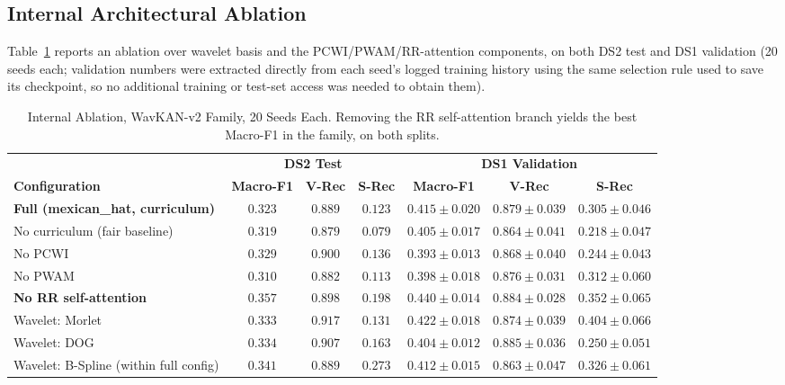 \documentclass[journal,twoside,web]{ieeecolor}
\begin{document}
\subsection{Internal Architectural Ablation}
\label{sec:results_ablation}
Table~\ref{tab:family_ablation} reports an ablation over wavelet basis and the PCWI/PWAM/RR-attention components, on both DS2 test and DS1 validation (20 seeds each; validation numbers were extracted directly from each seed's logged training history using the same selection rule used to save its checkpoint, so no additional training or test-set access was needed to obtain them).

\begin{table}[!t]
\centering
\caption{Internal Ablation, WavKAN-v2 Family, 20 Seeds Each. Removing the RR self-attention branch yields the best Macro-F1 in the family, on both splits.}
\label{tab:family_ablation}
\footnotesize
\begin{tabular}{l c c c c c c}
\toprule
& \multicolumn{3}{c}{\textbf{DS2 Test}} & \multicolumn{3}{c}{\textbf{DS1 Validation}} \\
\textbf{Configuration} & \textbf{Macro-F1} & \textbf{V-Rec} & \textbf{S-Rec} & \textbf{Macro-F1} & \textbf{V-Rec} & \textbf{S-Rec} \\ \midrule
\textbf{Full (mexican\_hat, curriculum)} & $0.323$ & $0.889$ & $0.123$ & $0.415\pm0.020$ & $0.879\pm0.039$ & $0.305\pm0.046$ \\
No curriculum (fair baseline) & $0.319$ & $0.879$ & $0.079$ & $0.405\pm0.017$ & $0.864\pm0.041$ & $0.218\pm0.047$ \\
No PCWI & $0.329$ & $0.900$ & $0.136$ & $0.393\pm0.013$ & $0.868\pm0.040$ & $0.244\pm0.043$ \\
No PWAM & $0.310$ & $0.882$ & $0.113$ & $0.398\pm0.018$ & $0.876\pm0.031$ & $0.312\pm0.060$ \\
\textbf{No RR self-attention} & $\mathbf{0.357}$ & $0.898$ & $0.198$ & $\mathbf{0.440\pm0.014}$ & $0.884\pm0.028$ & $0.352\pm0.065$ \\
Wavelet: Morlet & $0.333$ & $0.917$ & $0.131$ & $0.422\pm0.018$ & $0.874\pm0.039$ & $0.404\pm0.066$ \\
Wavelet: DOG & $0.334$ & $0.907$ & $0.163$ & $0.404\pm0.012$ & $0.885\pm0.036$ & $0.250\pm0.051$ \\
Wavelet: B-Spline (within full config) & $0.341$ & $0.889$ & $0.273$ & $0.412\pm0.015$ & $0.863\pm0.047$ & $0.326\pm0.061$ \\ \bottomrule
\end{tabular}
\end{table}
\end{document}
